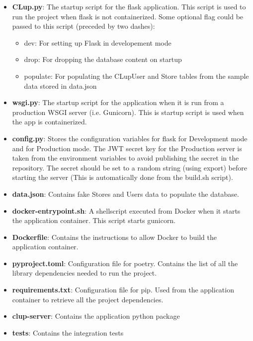 \begin{itemize}
    \item \textbf{CLup.py}: The startup script for the flask application. This script is used to run the project when flask is not containerized. Some optional flag could be passed to this script (preceded by two dashes):
          \begin{itemize}
              \item dev:  For setting up Flask in developement mode
              \item drop: For dropping the database content on startup
              \item populate: For populating the CLupUser and Store tables from the sample data stored in data.json
          \end{itemize}
    \item \textbf{wsgi.py}: The startup script for the application when it is run from a production WSGI server (i.e. Gunicorn). This is startup script is used when the app is containerized.
    \item \textbf{config.py}: Stores the configuration variables for flask for Development mode and for Production mode. The JWT secret key for the Production server is taken from the environment variables to avoid publishing the secret in the repository. The secret should be set to a random string (using export) before starting the server (This is automatically done from the build.sh script).
    \item \textbf{data.json}: Contains fake Stores and Users data to populate the database.
    \item \textbf{docker-entrypoint.sh}: A shellscript executed from Docker when it starts the application container. This script starts gunicorn.
    \item \textbf{Dockerfile}: Contains the instructions to allow Docker to build the application container.
    \item \textbf{pyproject.toml}: Configuration file for poetry. Contains the list of all the library dependencies needed to run the project.
    \item \textbf{requirements.txt}: Configuration file for pip. Used from the application container to retrieve all the project dependencies.
    \item \textbf{clup-server}: Contains the application python package
    \item \textbf{tests}: Contains the integration tests
\end{itemize}

